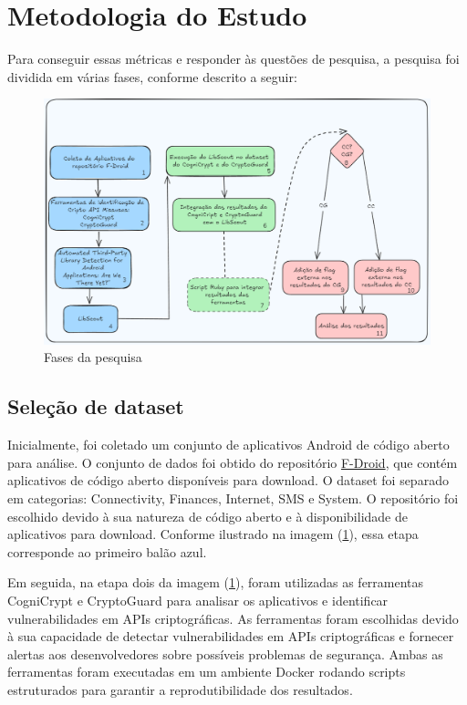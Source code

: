 \section{Metodologia do Estudo}

Para conseguir essas métricas e responder às questões de pesquisa, a pesquisa foi dividida em várias fases, conforme descrito a seguir:
\begin{figure}[!ht]
  \centering
  \includegraphics[scale=0.5]{img/research_steps2.png}
  \caption{Fases da pesquisa}
  \label{img: research_steps2}
\end{figure}

\FloatBarrier

\subsection{Seleção de dataset} 

Inicialmente, foi coletado um conjunto de aplicativos Android de código aberto para análise.  O conjunto de dados foi obtido do repositório \href{https://f-droid.org/pt_BR/packages/}{F-Droid}, que contém aplicativos de código aberto disponíveis para download. O dataset foi separado em categorias: Connectivity, Finances, Internet, SMS e System. O repositório foi escolhido devido à sua natureza de código aberto e à disponibilidade de aplicativos para download. Conforme ilustrado na imagem (\ref{img: research_steps2}), essa etapa corresponde ao primeiro balão azul.

Em seguida, na etapa dois da imagem (\ref{img: research_steps2}),  foram utilizadas as ferramentas CogniCrypt e CryptoGuard para analisar os aplicativos e identificar vulnerabilidades em APIs criptográficas. As ferramentas foram escolhidas devido à sua capacidade de detectar vulnerabilidades em APIs criptográficas e fornecer alertas aos desenvolvedores sobre possíveis problemas de segurança. Ambas as ferramentas foram executadas em um ambiente Docker rodando scripts estruturados para garantir a reprodutibilidade dos resultados. 


